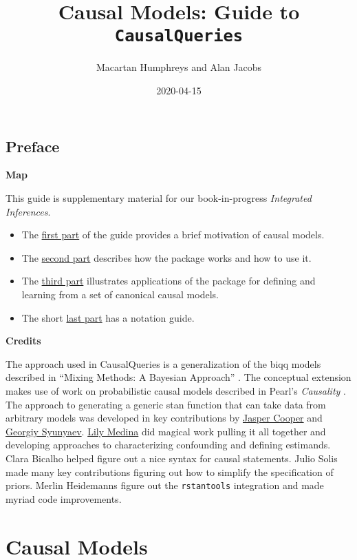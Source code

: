 \documentclass[
  12pt,
]{book}
\title{Causal Models: Guide to \texttt{CausalQueries}}
\author{Macartan Humphreys and Alan Jacobs}
\date{2020-04-15}
\providecommand{\tightlist}{%
  \setlength{\itemsep}{0pt}\setlength{\parskip}{0pt}}
\begin{document}
\maketitle

{
\setcounter{tocdepth}{1}
\tableofcontents
}
\hypertarget{preface}{%
\chapter*{Preface}\label{preface}}

\textbf{Map}

This guide is supplementary material for our book-in-progress \emph{Integrated Inferences}.

\begin{itemize}
\tightlist
\item
  The \protect\hyperlink{cm}{first part} of the guide provides a brief motivation of causal models.
\item
  The \protect\hyperlink{package}{second part} describes how the package works and how to use it.
\item
  The \protect\hyperlink{applications}{third part} illustrates applications of the package for defining and learning from a set of canonical causal models.
\item
  The short \protect\hyperlink{notation}{last part} has a notation guide.
\end{itemize}

\textbf{Credits}

The approach used in CausalQueries is a generalization of the biqq models described in ``Mixing Methods: A Bayesian Approach'' \citep{humphreys2015mixing}. The conceptual extension makes use of work on probabilistic causal models described in Pearl's \emph{Causality} \citep{pearl2009causality}. The approach to generating a generic stan function that can take data from arbitrary models was developed in key contributions by \href{http://jasper-cooper.com/}{Jasper Cooper} and \href{http://gsyunyaev.com/}{Georgiy Syunyaev}. \href{https://lilymedina.github.io/}{Lily Medina} did magical work pulling it all together and developing approaches to characterizing confounding and defining estimands. Clara Bicalho helped figure out a nice syntax for causal statements. Julio Solis made many key contributions figuring out how to simplify the specification of priors. Merlin Heidemanns figure out the \texttt{rstantools} integration and made myriad code improvements.

\hypertarget{part-causal-models}{%
\part{Causal Models}\label{part-causal-models}}
\end{document}
